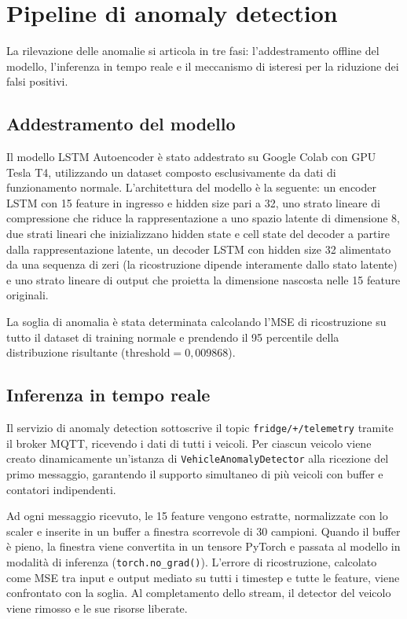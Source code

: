 \section{Pipeline di anomaly detection}
\label{sec:anomaly_detection}

La rilevazione delle anomalie si articola in tre fasi: l'addestramento offline del modello, l'inferenza in tempo reale e il meccanismo di isteresi per la riduzione dei falsi positivi.

\subsection{Addestramento del modello}

Il modello LSTM Autoencoder è stato addestrato su Google Colab con GPU Tesla T4, utilizzando un dataset composto esclusivamente da dati di funzionamento normale. L'architettura del modello è la seguente: un encoder LSTM con 15 feature in ingresso e hidden size pari a 32, uno strato lineare di compressione che riduce la rappresentazione a uno spazio latente di dimensione 8, due strati lineari che inizializzano hidden state e cell state del decoder a partire dalla rappresentazione latente, un decoder LSTM con hidden size 32 alimentato da una sequenza di zeri (la ricostruzione dipende interamente dallo stato latente) e uno strato lineare di output che proietta la dimensione nascosta nelle 15 feature originali.

La soglia di anomalia è stata determinata calcolando l'MSE di ricostruzione su tutto il dataset di training normale e prendendo il 95\textdegree{} percentile della distribuzione risultante ($\text{threshold} = 0,009868$).
\subsection{Inferenza in tempo reale}

Il servizio di anomaly detection sottoscrive il topic \texttt{fridge/+/telemetry} tramite il broker MQTT, ricevendo i dati di tutti i veicoli. Per ciascun veicolo viene creato dinamicamente un'istanza di \texttt{VehicleAnomalyDetector} alla ricezione del primo messaggio, garantendo il supporto simultaneo di più veicoli con buffer e contatori indipendenti.

Ad ogni messaggio ricevuto, le 15 feature vengono estratte, normalizzate con lo scaler e inserite in un buffer a finestra scorrevole di 30 campioni. Quando il buffer è pieno, la finestra viene convertita in un tensore PyTorch e passata al modello in modalità di inferenza (\texttt{torch.no\_grad()}). L'errore di ricostruzione, calcolato come MSE tra input e output mediato su tutti i timestep e tutte le feature, viene confrontato con la soglia. Al completamento dello stream, il detector del veicolo viene rimosso e le sue risorse liberate.
